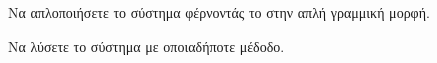 
\begin{rlist}
\item Να απλοποιήσετε το σύστημα φέρνοντάς το στην απλή γραμμική μορφή.
\item Να λύσετε το σύστημα με οποιαδήποτε μέδοδο.
\end{rlist}